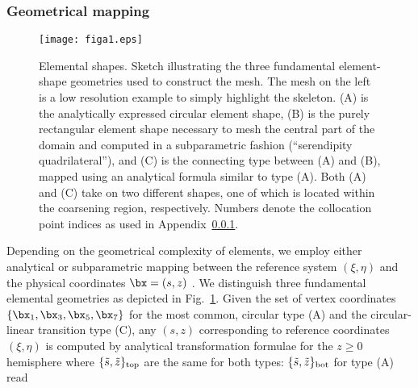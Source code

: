\subsubsection{Geometrical mapping} \label{appsection:geom_mapping}
%
\begin{figure}[htb!]
\begin{center}
\texttt{[image: figa1.eps]}
\caption{Elemental shapes. Sketch illustrating the three fundamental
element-shape geometries used to construct the mesh.
The mesh on the left is a low resolution example to simply highlight
the skeleton. (A) is the analytically expressed circular
element shape, (B) is the purely rectangular
element shape necessary to mesh the central part of the domain and computed in
a subparametric fashion (``serendipity quadrilateral''), and (C) is the
connecting type between (A) and (B), mapped using an analytical formula
similar to type (A).
Both (A) and (C) take on two different shapes, one of which is located
within the coarsening region, respectively.
Numbers denote the collocation point
indices as used in Appendix~\ref{appsection:geom_mapping}.}
\label{figa1}
\end{center}
\end{figure}
%
%
Depending on the geometrical complexity of elements, we employ either
analytical or subparametric mapping between the reference system
$(\xi,\eta)$ and the physical coordinates $\bx=(s,z)$ \citep{fournier04}.
We distinguish three fundamental elemental geometries as depicted in
Fig.~\ref{figa1}. Given the set of vertex coordinates
$\{\bx_1,\bx_3,\bx_5,\bx_7\}$ for the most common, circular type (A) and
the circular-linear transition type (C), any $(s,z)$ corresponding to
reference coordinates $(\xi,\eta)$  is computed by analytical transformation
formulae for the $z\ge 0$ hemisphere
%
\eq \label{appeq:generic_sz_a_c}
\en
%
where $\{\tilde{s},\tilde{z}\}_{\rm top}$ are the same for both types:
%
\eq \label{appeq:sz_top_ac}
\en
%
$\{\tilde{s},\tilde{z}\}_{\rm bot}$ for type (A) read
